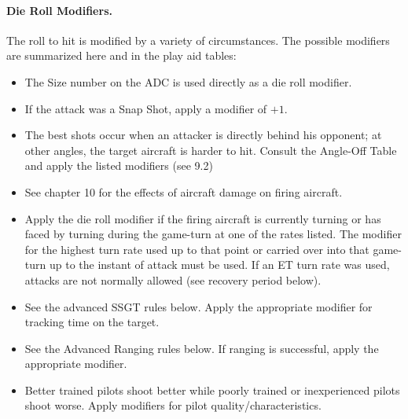     
\paragraph{Die Roll Modifiers.} The roll to hit is modified by a variety of circumstances. The possible modifiers are summarized here and in the play aid tables:

\begin{itemize}

    \item{} The Size number on the ADC is used directly as a die roll modifier.

    \item{} If the attack was a Snap Shot, apply a modifier of $+1$.

    \item{} The best shots occur when an attacker is directly behind his opponent; at other angles, the target aircraft is harder to hit. Consult the Angle-Off Table and apply the listed modifiers (see 9.2)


    \item{} See chapter 10 for the effects of aircraft damage on firing aircraft.

    \item{} Apply the die roll modifier if the firing aircraft is currently turning or has faced by turning during the game-turn at one of the rates listed. The modifier for the highest turn rate used up to that point or carried over into that game-turn up to the instant of attack must be used. If an ET turn rate was used, attacks are not normally allowed (see recovery period below).

    \item{} See the advanced SSGT rules below. Apply the appropriate modifier for tracking time on the target.

    \item{} See the Advanced Ranging rules below. If ranging is successful, apply the appropriate modifier.

    \item{} Better trained pilots shoot better while poorly trained or inexperienced pilots shoot worse. Apply modifiers for pilot quality/characteristics.


\end{itemize}

